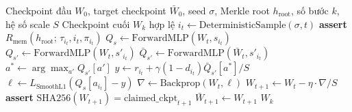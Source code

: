 \documentclass[12pt,a4paper,oneside]{report}
\begin{document}
\vspace{1cm}

\begin{algorithm}[H]
\caption{Kiểm chứng đoạn huấn luyện $k$ bước ($k$-Step Training Fragment Verification)}
\label{alg:training-fragment}
\begin{algorithmic}[1]
\Require Checkpoint đầu $W_0$, target checkpoint $\bar{W}_0$,
  seed $\sigma$, Merkle root $h_{\text{root}}$, số bước $k$, hệ số scale $S$
\Ensure Checkpoint cuối $W_k$ hợp lệ
  \State $i_t \gets \text{DeterministicSample}(\sigma, t)$
  \State \textbf{assert} $R_{\text{mem}}(h_{\text{root}};\, \tau_{i_t},
    i_t, \pi_{i_t})$
  \State $Q_s \gets \text{ForwardMLP}(W_t, s_{i_t})$
  \State $Q_{s'} \gets \text{ForwardMLP}(W_t, s'_{i_t})$
  \State $\bar{Q}_{s'} \gets \text{ForwardMLP}(\bar{W}_t, s'_{i_t})$
  \State $a^* \gets \arg\max_{a'} Q_{s'}[a']$
  \State $y \gets r_{i_t} + \gamma(1 - d_{i_t}) \bar{Q}_{s'}[a^*] / S$
  \State $\ell \gets L_{\text{SmoothL1}}(Q_s[a_{i_t}] - y)$
  \State $\nabla \gets \text{Backprop}(W_t, \ell)$
  \State $W_{t+1} \gets W_t - \eta \cdot \nabla / S$
  \State \textbf{assert} $\text{SHA256}(W_{t+1}) = \text{claimed\_ckpt}_{t+1}$
    \State $\bar{W}_{t+1} \gets W_{t+1}$
  \EndIf
\EndFor
\State \Return $W_k$
\end{algorithmic}
\end{algorithm}
\end{document}
